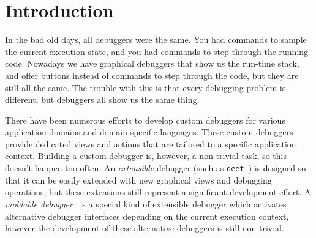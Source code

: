 \documentclass[sigplan,anonymous,review,10pt]{acmart}
\newcommand\ac[1]{\nbc{AC}{#1}{teal}}
\begin{document}
\maketitle

\section{Introduction}\label{sec:intro}

In the bad old days, all debuggers were the same.
You had commands to sample the current execution state, and you had commands to step through the running code.
Nowadays we have graphical debuggers that show us the run-time stack, and offer buttons instead of commands to step through the code, but they are still all the same.
The trouble with this is that every debugging problem is different, but debuggers all show us the same thing.

There have been numerous efforts to develop custom debuggers for various application domains and domain-specific languages.
These custom debuggers provide dedicated views and actions that are tailored to a specific application context.
Building a custom debugger is, however, a non-trivial task, so this doesn't happen too often.
An \emph{extensible} debugger (such as {\tt deet}~\cite{Hans97a}) is designed so that it can be easily extended with new graphical views and debugging operations, but these extensions still represent a significant development effort.
A \emph{moldable debugger}~\cite{Chis15c} is a special kind of extensible debugger which activates alternative debugger interfaces depending on the current execution context, however the development of these alternative debuggers is still non-trivial.

\end{document}
